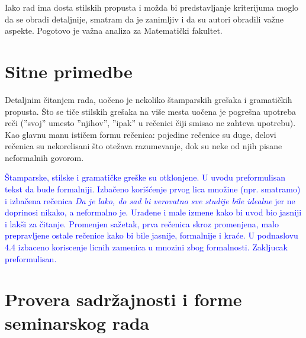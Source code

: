 \documentclass[a4paper]{report}
\newcommand{\odgovor}[1]{\textcolor{blue}{#1}}
\begin{document}
 Iako rad ima dosta stilskih propusta i možda bi predstavljanje kriterijuma moglo da se obradi detaljnije, smatram da je zanimljiv i da su autori obradili važne aspekte. Pogotovo je važna analiza za Matematički fakultet.
 
 
 \section{Sitne primedbe}
 Detaljnim čitanjem rada, uočeno je nekoliko štamparskih grešaka i gramatičkih propusta. Što se tiče stilskih grešaka na više mesta uočena je pogrešna upotreba reči (''svoj'' umesto ''njihov'', ''ipak'' u rečenici čiji smisao ne zahteva upotrebu). Kao glavnu manu ističem formu rečenica: pojedine rečenice su duge, delovi rečenica su nekorelisani što otežava razumevanje, dok su neke od njih pisane neformalnih govorom.
 
 
 \odgovor{Štamparske, stilske  i gramatičke greške su otklonjene.}
 \odgovor{U uvodu preformulisan tekst da bude formalniji. Izbačeno korišćenje prvog lica množine (npr. smatramo) i izbačena rečenica \emph{Da je lako, do sad bi verovatno sve studije bile idealne} jer ne doprinosi nikako, a neformalno je. Urađene i male izmene kako bi uvod bio jasniji i lakši za čitanje. Promenjen sažetak, prva rečenica skroz promenjena, malo prepravljene ostale rečenice kako bi bile jasnije, formalnije i kraće. U podnaslovu 4.4 izbaceno koriscenje licnih zamenica u mnozini zbog formalnosti. Zakljucak preformulisan. }
 
 \section{Provera sadržajnosti i forme seminarskog rada}
 
\end{document}
